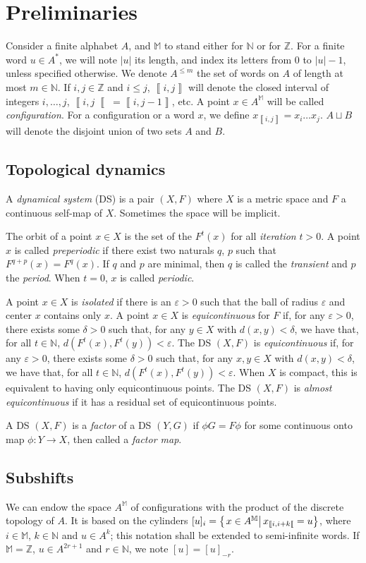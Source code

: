 \documentclass{llncs}
\newcommand{\M}{{\mathbb M}}
\newcommand{\am}{A^\M}
\newcommand{\Zset}{{\mathbb Z}}
\newcommand{\Nset}{{\mathbb N}}
\newcommand{\length}[1]{\left|#1\right|}
\newcommand{\co}[2]{\left\llbracket #1,#2\right\llbracket}\newcommand{\cc}[2]{\left\llbracket #1,#2\right\rrbracket}\newcommand{\oo}[2]{\left\rrbracket #1,#2\right\llbracket}\newcommand{\oc}[2]{\left\rrbracket #1,#2\right\rrbracket}\newcommand{\ci}[1]{\co{#1}\infty}\newcommand{\io}[1]{\oo{-\infty}{#1}}\newcommand{\oi}[1]{\oo{#1}\infty}\newcommand{\ic}[1]{\oc{-\infty}{#1}}
\newcommand{\scc}[2]{_{\cc{#1}{#2}}}\newcommand{\sco}[2]{_{\co{#1}{#2}}}\newcommand{\soo}[2]{_{\oo{#1}{#2}}}\newcommand{\soc}[2]{_{\oc{#1}{#2}}}\newcommand{\sci}[1]{_{\ci{#1}}}\newcommand{\sio}[1]{_{\io{#1}}}\newcommand{\soi}[1]{_{\oi{#1}}}\newcommand{\sic}[1]{_{\ic{#1}}}
\newcommand{\sett}[2]{\left\{\left.#1\vphantom{#2}\right|#2\right\}}
\newcommand{\set}[3]{\sett{#1\in#2}{#3}}
\begin{document}
\section{Preliminaries}
Consider a finite alphabet $A$, and $\M$ to stand either for $\Nset$ or for $\Zset$.
For a finite word $u\in A^*$, we will note $\length u$ its length, and index its letters from $0$ to $\length u-1$, unless specified otherwise.
We denote $A^{\le m}$ the set of words on $A$ of length at most $m\in\Nset$.
If $i,j\in\Zset$ and $i\le j$, $\cc ij$ will denote the closed interval of integers $i,\ldots,j$, $\co ij=\cc i{j-1}$, etc.
A point $x\in\am$ will be called \emph{configuration}.
For a configuration or a word $x$, we define $x\scc ij=x_i\ldots x_j$.
$A\sqcup B$ will denote the disjoint union of two sets $A$ and $B$.
\subsection{Topological dynamics}\label{sec:top}
A \emph{dynamical system} (DS) is a pair $(X,F)$ where $X$ is a metric space and $F$ a continuous self-map of $X$. Sometimes the space will be implicit.

The orbit of a point $x\in X$ is the set of the $F^t(x)$ for all \emph{iteration} ${t>0}$.
A point $x$ is called \emph{preperiodic} if there exist two naturals $q$, $p$ such that $F^{q+p}(x)=F^q(x)$.
If $q$ and $p$ are minimal, then $q$ is called the \emph{transient} and $p$ the \emph{period}.
When $t=0$, $x$ is called \emph{periodic}.


A point $x\in X$ is \emph{isolated} if there is an $\varepsilon>0$ such that the ball of radius $\varepsilon$ and center $x$ contains only $x$.
A point $x\in X$ is \emph{equicontinuous} for $F$ if, for any $\varepsilon>0$, there exists some $\delta>0$ such that, for any $y\in X$ with $d(x,y)<\delta$, we have that, for all $t\in\Nset$, $d(F^t(x),F^t(y)) < \varepsilon$.
The DS $(X,F)$ is \emph{equicontinuous} if, for any $\varepsilon>0$, there exists some $\delta>0$ such that, for any $x,y\in X$ with $d(x,y)<\delta$, we have that, for all $t\in\Nset$, $d(F^t(x),F^t(y)) < \varepsilon$.
When $X$ is compact, this is equivalent to having only equicontinuous points.
The DS $(X,F)$ is \emph{almost equicontinuous} if it has a residual set of equicontinuous points.

A DS $(X,F)$ is a \emph{factor} of a DS $(Y,G)$ if $\phi G=F\phi$ for some continuous onto map $\phi:Y\to X$, then called a \emph{factor map}.
\subsection{Subshifts}
We can endow the space $\am$ of {configurations} with the product of the discrete topology of $A$.
It is based on the cylinders $[u]_i=\set x\am{x\sco i{i+k}=u}$, where $i\in\M$, $k\in\Nset$ and $u\in A^k$; this notation shall be extended to semi-infinite words.
If $\M=\Zset$, $u\in A^{2r+1}$ and $r\in\Nset$, we note $[u]=[u]_{-r}$.
\end{document}
